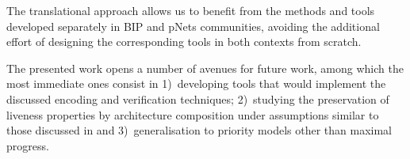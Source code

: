 \documentclass{llncs}
\newcommand{\newCoord}[1]{{\color{blue}#1}}
\begin{document}
The translational approach allows us to benefit from the methods
and tools developed separately in BIP and pNets communities,
avoiding the additional effort of designing the corresponding
tools in both contexts from scratch.  

\newCoord{The presented work opens a number of avenues for future
  work, among which the most immediate ones consist in 1)~developing
  tools that would implement the discussed encoding and verification
  techniques; 2)~studying the preservation of liveness properties by
  architecture composition under assumptions similar to those
  discussed in \cite{AttieBBJS16-architectures-faoc} and
  3)~generalisation to priority models other than maximal progress.}
%
%
%
%
%
%
%





\end{document}
